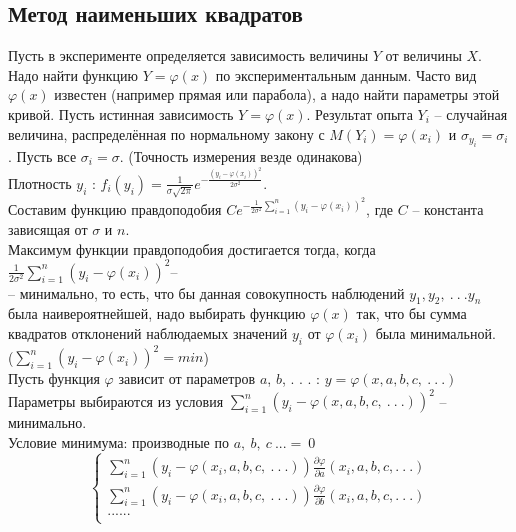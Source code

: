 \documentclass[russian, 12pt, fleqn,x11names]{article}
\begin{document}
\subsection{Метод наименьших квадратов}
\noindent
Пусть в эксперименте определяется зависимость величины $Y$ от величины $X$. Надо найти функцию $Y=\varphi(x)$ по экспериментальным данным. Часто вид $\varphi(x)$ известен (например прямая или парабола), а надо найти параметры этой кривой. Пусть истинная зависимость $Y = \varphi(x)$. Результат опыта $Y_i$ -- случайная величина, распределённая по нормальному закону с $M(Y_i)=\varphi(x_i)$ и $\sigma_{y_i} = \sigma_i$. Пусть все $\sigma_i = \sigma$. (Точность измерения везде одинакова)\\
Плотность $y_i$ : $f_i(y_i) = \frac{1}{\sigma \sqrt{2\pi}} e^{-\frac{(y_i - \varphi(x_i))^2}{2\sigma^2}}$.\\
Составим функцию правдоподобия  $Ce^{-\frac{1}{2\sigma^2}\displaystyle{\sum \limits_{i = 1}^{n}} (y_i - \varphi(x_i))^2}$, где $C$ -- константа зависящая от $\sigma$ и $n$.\\
Максимум функции правдоподобия достигается тогда, когда $\frac{1}{2\sigma^2}\displaystyle{\sum \limits_{i = 1}^{n}} (y_i-\varphi(x_i))^2$--\\-- минимально, то есть, что бы данная совокупность наблюдений $y_1, y_2,\ .\ .\ .y_n$ была наивероятнейшей, надо выбирать функцию $\varphi(x)$ так, что бы сумма квадратов отклонений наблюдаемых значений $y_i$ от $\varphi(x_i)$ была минимальной.\\
 ($\displaystyle{\sum \limits_{i = 1}^{n}} (y_i - \varphi(x_i))^2 = min$)\\
Пусть функция $\varphi$ зависит от параметров $a$, $b$, . . . : $y = \varphi(x, a, b, c, \ .\ .\ .)$\\
Параметры выбираются из условия $\displaystyle{\sum \limits_{i = 1}^{n}} (y_i - \varphi(x, a, b, c, \ .\ .\ .))^2$ -- минимально.\\
Условие минимума: производные по $a,\ b,\ c\ ...=\ 0$
\\
\noindent
\begin{equation*} 
 \begin{cases}
   \displaystyle{\sum \limits_{i = 1}^{n}} (y_i -  \varphi(x_i, a, b, c,\ .\ .\ .))\frac{\partial \varphi}{\partial a}(x_i, a, b, c, .\ .\ . ) \\
   \displaystyle{\sum \limits_{i = 1}^{n}} (y_i -  \varphi(x_i, a, b, c,\ .\ .\ .))\frac{\partial \varphi}{\partial b}(x_i, a, b, c, .\ .\ . ) \\
   ......\\
 \end{cases}
\end{equation*}
\end{document}
